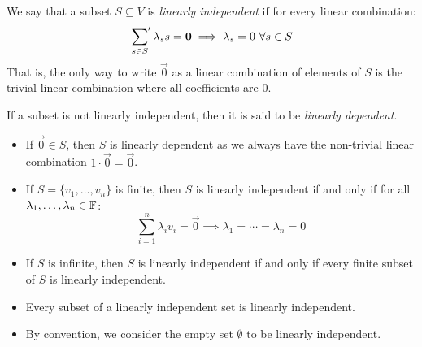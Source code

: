 \documentclass[../main.tex]{subfiles}
\begin{document}
\begin{definition}
  We say that a subset $S \subseteq V$ is \textit{linearly independent} if for every linear combination:
  \[
    \sideset{}{'}\sum_{s \in S} \lambda_s s  = \mathbf{\bm{0}} \implies \lambda_s = 0\ \forall s \in S
  \]
  That is, the only way to write $\vec{0}$ as a linear combination of elements of $S$ is the trivial linear combination where all coefficients are 0.

  If a subset is not linearly independent, then it is said to be \textit{linearly dependent}.
\end{definition}
\begin{remark}[Remarks]
  \begin{itemize}
    \item If $\vec{0} \in S$, then $S$ is linearly dependent as we always have the non-trivial linear combination $1 \cdot \vec{0} = \vec{0}$.
    \item If $S = \{v_1, \ldots, v_n\}$ is finite, then $S$ is linearly independent if and only if for all $\lambda_1, \ldots, \lambda_n \in \mathbb{F}$:
      \[
        \sum_{i = 1}^{n} \lambda_i v_i = \vec{0} \implies \lambda_1 = \cdots = \lambda_n = 0
      \]
    \item If $S$ is infinite, then $S$ is linearly independent if and only if every finite subset of $S$ is linearly independent.
    \item Every subset of a linearly independent set is linearly independent.
    \item By convention, we consider the empty set $\emptyset$ to be linearly independent.
  \end{itemize}
\end{remark}
\end{document}
